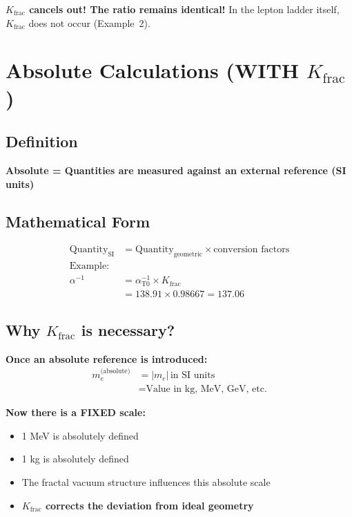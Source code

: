 	\textbf{$K_{\text{frac}}$ cancels out! The ratio remains identical!} In the lepton ladder itself, $K_{\text{frac}}$ does not occur (Example~2).
	
	\section{Absolute Calculations (WITH $K_{\text{frac}}$)}
	
	\subsection{Definition}
	
	\textbf{Absolute = Quantities are measured against an external reference (SI units)}
	
	\subsection{Mathematical Form}
	\begin{align*}
		\text{Quantity}_{\text{SI}} &= \text{Quantity}_{\text{geometric}} \times \text{conversion factors} \\
		\text{Example:} & \\
		\alpha^{-1} &= \alpha_{\text{T0}}^{-1} \times K_{\text{frac}} \\
		&= 138.91 \times 0.98667 = 137.06
	\end{align*}
	
	\subsection{Why $K_{\text{frac}}$ is necessary?}
	
	\textbf{Once an absolute reference is introduced:}
	\begin{align*}
		m_e^{\text{(absolute)}} &= |m_e|\,\text{in SI units} \\
		&= \text{Value in kg, MeV, GeV, etc.}
	\end{align*}
	
	\textbf{Now there is a FIXED scale:}
	\begin{itemize}
		\item 1 MeV is absolutely defined
		\item 1 kg is absolutely defined  
		\item The fractal vacuum structure influences this absolute scale
		\item \textbf{$K_{\text{frac}}$ corrects the deviation from ideal geometry}
	\end{itemize}
	
